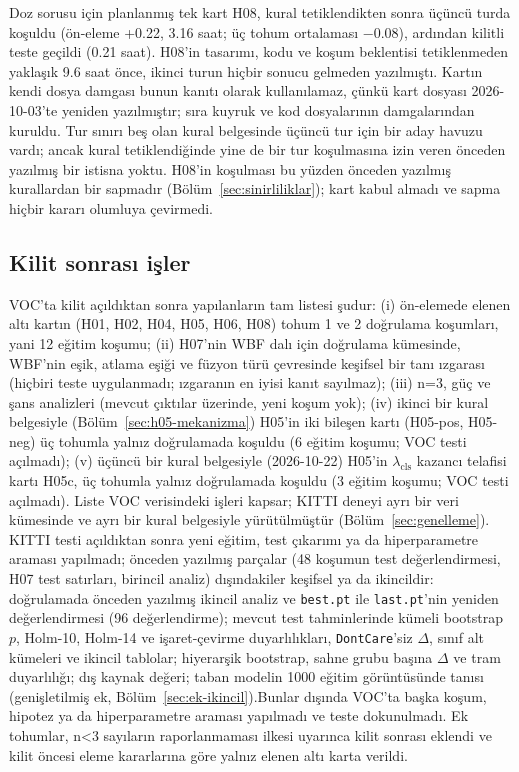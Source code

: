 Doz sorusu için planlanmış tek kart H08, kural tetiklendikten sonra üçüncü turda koşuldu (ön-eleme +0.22, 3.16 saat; üç tohum ortalaması $-$0.08), ardından kilitli teste geçildi (0.21 saat). H08'in tasarımı, kodu ve koşum beklentisi tetiklenmeden yaklaşık 9.6 saat önce, ikinci turun hiçbir sonucu gelmeden yazılmıştı. Kartın kendi dosya damgası bunun kanıtı olarak kullanılamaz, çünkü kart dosyası 2026-10-03'te yeniden yazılmıştır; sıra kuyruk ve kod dosyalarının damgalarından kuruldu. Tur sınırı beş olan kural belgesinde üçüncü tur için bir aday havuzu vardı; ancak kural tetiklendiğinde yine de bir tur koşulmasına izin veren önceden yazılmış bir istisna yoktu. H08'in koşulması bu yüzden önceden yazılmış kurallardan bir sapmadır (Bölüm~\ref{sec:sinirliliklar}); kart kabul almadı ve sapma hiçbir kararı olumluya çevirmedi.

\subsection{Kilit sonrası işler}\label{sec:ek-kilit}
VOC'ta kilit açıldıktan sonra yapılanların tam listesi şudur: (i) ön-elemede elenen altı kartın (H01, H02, H04, H05, H06, H08) tohum 1 ve 2 doğrulama koşumları, yani 12 eğitim koşumu; (ii) H07'nin WBF dalı için doğrulama kümesinde, WBF'nin eşik, atlama eşiği ve füzyon türü çevresinde keşifsel bir tanı ızgarası (hiçbiri teste uygulanmadı; ızgaranın en iyisi kanıt sayılmaz); (iii) n=3, güç ve şans analizleri (mevcut çıktılar üzerinde, yeni koşum yok); (iv) ikinci bir kural belgesiyle (Bölüm~\ref{sec:h05-mekanizma}) H05'in iki bileşen kartı (H05-pos, H05-neg) üç tohumla yalnız doğrulamada koşuldu (6 eğitim koşumu; VOC testi açılmadı); (v) üçüncü bir kural belgesiyle (2026-10-22) H05'in $\lambda_{\mathrm{cls}}$ kazancı telafisi kartı H05c, üç tohumla yalnız doğrulamada koşuldu (3 eğitim koşumu; VOC testi açılmadı). Liste VOC verisindeki işleri kapsar; KITTI deneyi ayrı bir veri kümesinde ve ayrı bir kural belgesiyle yürütülmüştür (Bölüm~\ref{sec:genelleme}). KITTI testi açıldıktan sonra yeni eğitim, test çıkarımı ya da hiperparametre araması yapılmadı; önceden yazılmış parçalar (48 koşumun test değerlendirmesi, H07 test satırları, birincil analiz) dışındakiler keşifsel ya da ikincildir: doğrulamada önceden yazılmış ikincil analiz ve \texttt{best.pt} ile \texttt{last.pt}'nin yeniden değerlendirmesi (96 değerlendirme); mevcut test tahminlerinde kümeli bootstrap $p$, Holm-10, Holm-14 ve işaret-çevirme duyarlılıkları, \texttt{DontCare}'siz $\Delta$, sınıf alt kümeleri ve ikincil tablolar; hiyerarşik bootstrap, sahne grubu başına $\Delta$ ve tram duyarlılığı; dış kaynak değeri; taban modelin 1000 eğitim görüntüsünde tanısı (genişletilmiş ek, Bölüm~\ref{sec:ek-ikincil}).Bunlar dışında VOC'ta başka koşum, hipotez ya da hiperparametre araması yapılmadı ve teste dokunulmadı. Ek tohumlar, n<3 sayıların raporlanmaması ilkesi uyarınca kilit sonrası eklendi ve kilit öncesi eleme kararlarına göre yalnız elenen altı karta verildi.

